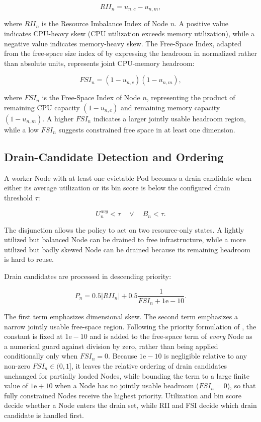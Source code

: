 \[
    RII_n = u_{n,c} - u_{n,m},
\]

where \(RII_n\) is the Resource Imbalance Index of Node \(n\). A positive value indicates CPU-heavy skew (CPU utilization exceeds memory utilization), while a negative value indicates memory-heavy skew. The Free-Space Index, adapted from the free-space size index of \citet{guo2025joint} by expressing the headroom in normalized rather than absolute units, represents joint CPU-memory headroom:

\[
    FSI_n = (1-u_{n,c})(1-u_{n,m}),
\]

where \(FSI_n\) is the Free-Space Index of Node \(n\), representing the product of remaining CPU capacity \((1-u_{n,c})\) and remaining memory capacity \((1-u_{n,m})\). A higher \(FSI_n\) indicates a larger jointly usable headroom region, while a low \(FSI_n\) suggests constrained free space in at least one dimension.

\subsection{Drain-Candidate Detection and Ordering}
\label{sec:defrag_drain_candidates}

A worker Node with at least one evictable Pod becomes a drain candidate when either its average utilization or its bin score is below the configured drain threshold \(\tau\):

\[
    U_n^{avg} < \tau
    \quad \lor \quad
    B_n < \tau.
\]

The disjunction allows the policy to act on two resource-only states. A lightly utilized but balanced Node can be drained to free infrastructure, while a more utilized but badly skewed Node can be drained because its remaining headroom is hard to reuse.

Drain candidates are processed in descending priority:

\[
    P_n =
    0.5\left|RII_n\right|
    +
    0.5\frac{1}{FSI_n+1\mathrm{e}{-}10}.
\]

The first term emphasizes dimensional skew. The second term emphasizes a narrow jointly usable free-space region. Following the priority formulation of \citet{guo2025joint}, the constant is fixed at \(1\mathrm{e}{-}10\) and is added to the free-space term of \emph{every} Node as a numerical guard against division by zero, rather than being applied conditionally only when \(FSI_n = 0\). Because \(1\mathrm{e}{-}10\) is negligible relative to any non-zero \(FSI_n \in (0,1]\), it leaves the relative ordering of drain candidates unchanged for partially loaded Nodes, while bounding the term to a large finite value of \(1\mathrm{e}{+}10\) when a Node has no jointly usable headroom (\(FSI_n = 0\)), so that fully constrained Nodes receive the highest priority. Utilization and bin score decide whether a Node enters the drain set, while RII and FSI decide which drain candidate is handled first.

